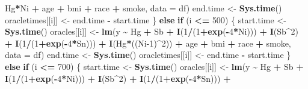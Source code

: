 \documentclass[12pt, twoside]{amherstthesis}
\newenvironment{Shaded}{\begin{snugshade}}{\end{snugshade}}
\newcommand{\AttributeTok}[1]{\textcolor[rgb]{0.13,0.29,0.53}{#1}}
\newcommand{\ControlFlowTok}[1]{\textcolor[rgb]{0.13,0.29,0.53}{\textbf{#1}}}
\newcommand{\DecValTok}[1]{\textcolor[rgb]{0.00,0.00,0.81}{#1}}
\newcommand{\FunctionTok}[1]{\textcolor[rgb]{0.13,0.29,0.53}{\textbf{#1}}}
\newcommand{\NormalTok}[1]{#1}
\newcommand{\OtherTok}[1]{\textcolor[rgb]{0.56,0.35,0.01}{#1}}
\newcommand{\SpecialCharTok}[1]{\textcolor[rgb]{0.81,0.36,0.00}{\textbf{#1}}}
\begin{document}
\begin{Shaded}
\begin{Highlighting}[]
\NormalTok{                           Hg}\SpecialCharTok{*}\NormalTok{Ni }\SpecialCharTok{+} 
\NormalTok{                           age }\SpecialCharTok{+}\NormalTok{ bmi }\SpecialCharTok{+}\NormalTok{ race }\SpecialCharTok{+}\NormalTok{ smoke, }\AttributeTok{data =}\NormalTok{ df)}
\NormalTok{      end.time }\OtherTok{\textless{}{-}} \FunctionTok{Sys.time}\NormalTok{()}
\NormalTok{      oracletimes[[i]] }\OtherTok{\textless{}{-}}\NormalTok{ end.time }\SpecialCharTok{{-}}\NormalTok{ start.time}
\NormalTok{    \} }\ControlFlowTok{else} \ControlFlowTok{if}\NormalTok{ (i }\SpecialCharTok{\textless{}=} \DecValTok{500}\NormalTok{) \{}
\NormalTok{      start.time }\OtherTok{\textless{}{-}} \FunctionTok{Sys.time}\NormalTok{()}
\NormalTok{      oracles[[i]] }\OtherTok{\textless{}{-}} \FunctionTok{lm}\NormalTok{(y }\SpecialCharTok{\textasciitilde{}}\NormalTok{ Hg }\SpecialCharTok{+}\NormalTok{ Sb }\SpecialCharTok{+}
                           \FunctionTok{I}\NormalTok{(}\DecValTok{1}\SpecialCharTok{/}\NormalTok{(}\DecValTok{1}\SpecialCharTok{+}\FunctionTok{exp}\NormalTok{(}\SpecialCharTok{{-}}\DecValTok{4}\SpecialCharTok{*}\NormalTok{Ni))) }\SpecialCharTok{+} \FunctionTok{I}\NormalTok{(Sb}\SpecialCharTok{\^{}}\DecValTok{2}\NormalTok{) }\SpecialCharTok{+} \FunctionTok{I}\NormalTok{(}\DecValTok{1}\SpecialCharTok{/}\NormalTok{(}\DecValTok{1}\SpecialCharTok{+}\FunctionTok{exp}\NormalTok{(}\SpecialCharTok{{-}}\DecValTok{4}\SpecialCharTok{*}\NormalTok{Sn))) }\SpecialCharTok{+}
                           \FunctionTok{I}\NormalTok{(Hg}\SpecialCharTok{*}\NormalTok{((Ni}\DecValTok{{-}1}\NormalTok{)}\SpecialCharTok{\^{}}\DecValTok{2}\NormalTok{)) }\SpecialCharTok{+} 
\NormalTok{                           age }\SpecialCharTok{+}\NormalTok{ bmi }\SpecialCharTok{+}\NormalTok{ race }\SpecialCharTok{+}\NormalTok{ smoke, }\AttributeTok{data =}\NormalTok{ df)}
\NormalTok{      end.time }\OtherTok{\textless{}{-}} \FunctionTok{Sys.time}\NormalTok{()}
\NormalTok{      oracletimes[[i]] }\OtherTok{\textless{}{-}}\NormalTok{ end.time }\SpecialCharTok{{-}}\NormalTok{ start.time}
\NormalTok{    \} }\ControlFlowTok{else} \ControlFlowTok{if}\NormalTok{ (i }\SpecialCharTok{\textless{}=} \DecValTok{700}\NormalTok{) \{}
\NormalTok{      start.time }\OtherTok{\textless{}{-}} \FunctionTok{Sys.time}\NormalTok{()}
\NormalTok{      oracles[[i]] }\OtherTok{\textless{}{-}} \FunctionTok{lm}\NormalTok{(y }\SpecialCharTok{\textasciitilde{}}\NormalTok{ Hg }\SpecialCharTok{+}\NormalTok{ Sb }\SpecialCharTok{+}
                           \FunctionTok{I}\NormalTok{(}\DecValTok{1}\SpecialCharTok{/}\NormalTok{(}\DecValTok{1}\SpecialCharTok{+}\FunctionTok{exp}\NormalTok{(}\SpecialCharTok{{-}}\DecValTok{4}\SpecialCharTok{*}\NormalTok{Ni))) }\SpecialCharTok{+} \FunctionTok{I}\NormalTok{(Sb}\SpecialCharTok{\^{}}\DecValTok{2}\NormalTok{) }\SpecialCharTok{+} \FunctionTok{I}\NormalTok{(}\DecValTok{1}\SpecialCharTok{/}\NormalTok{(}\DecValTok{1}\SpecialCharTok{+}\FunctionTok{exp}\NormalTok{(}\SpecialCharTok{{-}}\DecValTok{4}\SpecialCharTok{*}\NormalTok{Sn))) }\SpecialCharTok{+}

\end{Highlighting}
\end{Shaded}
\end{document}
